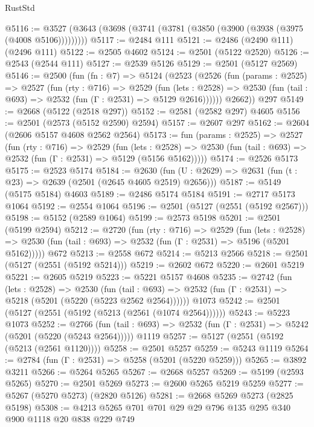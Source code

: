 \begin{lexlean}{RustStd}
\begin{coremodule}
{\begin{coremodule}
{{{{{{{{{{{{{{{{{{{{@5116 := @3527 (@3643 (@3698 (@3741 (@3781 (@3850 (@3900 (@3938 (@3975 (@4008 @5106)))))))))
@5117 := @2484 @111
@5121 := @2486 (@2490 @111) (@2496 @111)
@5122 := @2505 @4602
@5124 := @2501 (@5122 @2520)
@5126 := @2543 (@2544 @111)
@5127 := @2539 @5126
@5129 := @2501 (@5127 @2569)
@5146 := @2500
    (fun (fn : @7) =>
    @5124
      (@2523
        (@2526
          (fun (params : @2525) =>
          @2527
            (fun (rty : @716) =>
            @2529
              (fun (lets : @2528) =>
              @2530 (fun (tail : @693) => @2532 (fun (Γ : @2531) => @5129 @2616))))))
        @2662))
    @297
@5149 := @2668 (@5122 (@2518 @297))
@5152 := @2581 (@2582 @297) @4605
@5156 := @2501 (@2573 (@5152 @2590) @2594)
@5157 := @2607 @297
@5162 := @2604 (@2606 @5157 @4608 @2562 @2564)
@5173 := fun (params : @2525) =>
  @2527
    (fun (rty : @716) =>
    @2529
      (fun (lets : @2528) =>
      @2530 (fun (tail : @693) => @2532 (fun (Γ : @2531) => @5129 (@5156 @5162)))))
@5174 := @2526 @5173
@5175 := @2523 @5174
@5184 := @2630 (fun (U : @2629) => @2631 (fun (t : @23) => @2639 (@2501 (@2645 @4605 @2519) @2656)))
@5187 := @5149 (@5175 @5184) @4603
@5189 := @2486 @5174 @5184
@5191 := @2717 @5173 @1064
@5192 := @2554 @1064
@5196 := @2501 (@5127 (@2551 (@5192 @2567)))
@5198 := @5152 (@2589 @1064)
@5199 := @2573 @5198
@5201 := @2501 (@5199 @2594)
@5212 := @2720
    (fun (rty : @716) =>
    @2529
      (fun (lets : @2528) =>
      @2530 (fun (tail : @693) => @2532 (fun (Γ : @2531) => @5196 (@5201 @5162)))))
    @672
@5213 := @2558 @672
@5214 := @5213 @2566
@5218 := @2501 (@5127 (@2551 (@5192 @5214)))
@5219 := @2602 @672
@5220 := @2601 @5219
@5221 := @2605 @5219
@5223 := @5221 @5157 @4608
@5235 := @2742
    (fun (lets : @2528) =>
    @2530
      (fun (tail : @693) => @2532 (fun (Γ : @2531) => @5218 (@5201 (@5220 (@5223 @2562 @2564))))))
    @1073
@5242 := @2501 (@5127 (@2551 (@5192 (@5213 (@2561 (@1074 @2564))))))
@5243 := @5223 @1073
@5252 := @2766
    (fun (tail : @693) => @2532 (fun (Γ : @2531) => @5242 (@5201 (@5220 (@5243 @2564)))))
    @1119
@5257 := @5127 (@2551 (@5192 (@5213 (@2561 @1120))))
@5258 := @2501 @5257
@5259 := @5243 @1119
@5264 := @2784 (fun (Γ : @2531) => @5258 (@5201 (@5220 @5259)))
@5265 := @3892 @3211
@5266 := @5264 @5265
@5267 := @2668 @5257
@5269 := @5199 (@2593 @5265)
@5270 := @2501 @5269
@5273 := @2600 @5265 @5219 @5259
@5277 := @5267 (@5270 @5273) (@2820 @5126)
@5281 := @2668 @5269 @5273 (@2825 @5198)
@5308 := @4213
    @5265
    @701
    @701
    @29
    @29
    @796
    @135
    @295
    @340
    @900
    @1118
    @20
    @838
    @229
    @749
}}}}}}}}}}}}}}}}}}}}
\end{coremodule}}
\end{coremodule}
\end{lexlean}

